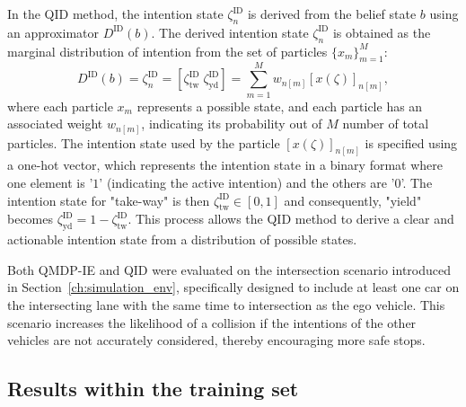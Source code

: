 In the QID method, the intention state $\zeta^\mathrm{ID}_n$ is derived from the belief state $b$ using an approximator $D^\mathrm{ID}(b)$. The derived intention state $\zeta^\mathrm{ID}_n$ is obtained as the marginal distribution of intention from the set of particles $\{ x_m \}^M_{m=1}$: 
\begin{equation}
    D^\mathrm{ID}(b) = \zeta^\mathrm{ID}_n = [\zeta^\mathrm{ID}_\text{tw} \; \zeta^\mathrm{ID}_\text{yd}] = \sum_{m=1}^M w_{n[m]} [x(\zeta)]_{n[m]},
    \label{eq:ID_i}
\end{equation}
where each particle $x_m$ represents a possible state, and each particle has an associated weight $w_{n[m]}$, indicating its probability out of $M$ number of total particles.
The intention state used by the particle $[x(\zeta)]_{n[m]}$ is specified using a one-hot vector, which represents the intention state in a binary format where one element is '$1$' (indicating the active intention) and the others are '$0$'. The intention state for "take-way" is then $\zeta^\mathrm{ID}_\text{tw} \in [0,1]$ and consequently, "yield" becomes  $\zeta^\mathrm{ID}_\text{yd} = 1 - \zeta^\mathrm{ID}_\text{tw}$.
This process allows the QID method to derive a clear and actionable intention state from a distribution of possible states.

Both QMDP-IE and QID were evaluated on the intersection scenario introduced in Section~\ref{ch:simulation_env}, specifically designed to include at least one car on the intersecting lane with the same time to intersection as the ego vehicle. This scenario increases the likelihood of a collision if the intentions of the other vehicles are not accurately considered, thereby encouraging more safe stops.

\subsection{Results within the training set}

